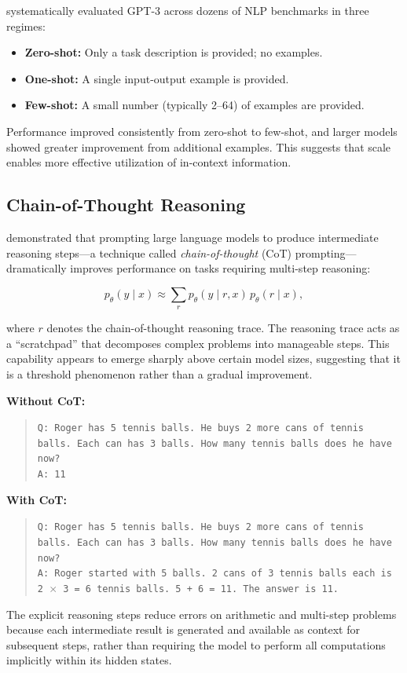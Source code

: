 \citet{brown2020} systematically evaluated GPT-3 across dozens of NLP benchmarks in three regimes:
\begin{itemize}[leftmargin=1.5em]
  \item \textbf{Zero-shot:} Only a task description is provided; no examples.
  \item \textbf{One-shot:} A single input-output example is provided.
  \item \textbf{Few-shot:} A small number (typically 2--64) of examples are provided.
\end{itemize}

Performance improved consistently from zero-shot to few-shot, and larger models showed greater improvement from additional examples. This suggests that scale enables more effective utilization of in-context information.

\subsection{Chain-of-Thought Reasoning}

\citet{wei2022} demonstrated that prompting large language models to produce intermediate reasoning steps---a technique called \emph{chain-of-thought} (CoT) prompting---dramatically improves performance on tasks requiring multi-step reasoning:

\begin{equation}
p_\theta(y \mid x) \approx \sum_{r} p_\theta(y \mid r, x) \, p_\theta(r \mid x),
\label{eq:cot}
\end{equation}

where $r$ denotes the chain-of-thought reasoning trace. The reasoning trace acts as a ``scratchpad'' that decomposes complex problems into manageable steps. This capability appears to emerge sharply above certain model sizes, suggesting that it is a threshold phenomenon rather than a gradual improvement.

\begin{example}
\textbf{Without CoT:}
\begin{quote}
\texttt{Q: Roger has 5 tennis balls. He buys 2 more cans of tennis balls. Each can has 3 balls. How many tennis balls does he have now?} \\
\texttt{A: 11}
\end{quote}
\textbf{With CoT:}
\begin{quote}
\texttt{Q: Roger has 5 tennis balls. He buys 2 more cans of tennis balls. Each can has 3 balls. How many tennis balls does he have now?} \\
\texttt{A: Roger started with 5 balls. 2 cans of 3 tennis balls each is 2 $\times$ 3 = 6 tennis balls. 5 + 6 = 11. The answer is 11.}
\end{quote}
The explicit reasoning steps reduce errors on arithmetic and multi-step problems because each intermediate result is generated and available as context for subsequent steps, rather than requiring the model to perform all computations implicitly within its hidden states.
\end{example}

